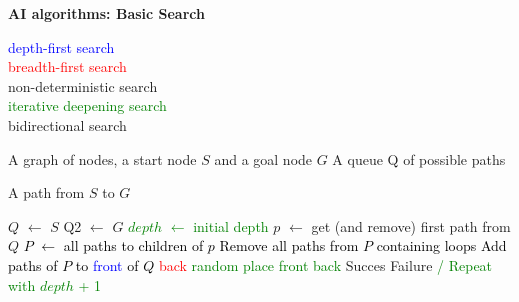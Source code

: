 \documentclass[11pt] {article}
\newcommand{\algorithmicinput}{\textbf{Input:}}
\newcommand{\algorithmicoutput}{\textbf{Output:}}
\newcommand{\INPUT}{\item[\algorithmicinput]}
\newcommand{\OUTPUT}{\item[\algorithmicoutput]}
\newcommand{\algorithmicalgo}{\textbf{Algorithm:}}
\newcommand{\ALGO}{\item[\algorithmicalgo]}
\begin{document}
\pagestyle{empty}


\begin{center}
\LARGE
\textbf{AI algorithms: Basic Search}\\
\end{center}
\vspace{1cm}

\noindent \textcolor{blue}{depth-first search}\\
\textcolor{red}{breadth-first search}\\
\textcolor[rgb]{1,0,1}{non-deterministic search}\\
\textcolor{green}{iterative deepening search}\\
\textcolor[rgb]{1,0.5,0}{bidirectional search}\\

\begin{algorithmic}
\INPUT
\STATE A graph of nodes, a start node $S$ and a goal node $G$
\STATE A queue Q of possible paths

\OUTPUT 
\STATE A path from $S$ to $G$
\end{algorithmic}
\begin{algorithmic}
\ALGO
\STATE $Q$ $\leftarrow$ $S$
\STATE \textcolor[rgb]{1,0.5,0}{Q2 $\leftarrow$ $G$}
\textcolor{green}{
\STATE $depth$ $\leftarrow$ initial depth
}
\STATE $p$ $\leftarrow$ get (and remove) first path from $Q$
\textcolor{green}{
\STATE \textcolor{black}{$P$ $\leftarrow$ all paths to children of $p$}
\STATE \textcolor{black}{Remove all paths from $P$ containing loops}
\STATE \textcolor{black}{Add paths of $P$ to} \textcolor{blue}{front} \textcolor{black}{of $Q$}
\STATE \hspace{3.1cm} \textcolor{red}{back}
\STATE \hspace{3.1cm} \textcolor[rgb]{1,0,1}{random place}
\STATE \hspace{3.1cm} \textcolor{green}{front}
\STATE \hspace{3.1cm} \textcolor[rgb]{1,0.5,0}{back}
\ENDIF
}
\ENDWHILE
{}
\STATE Succes
\ELSE
\STATE Failure \textcolor{green}{/ Repeat with $depth$ + 1}
\ENDIF
\end{algorithmic}
\end{document}
